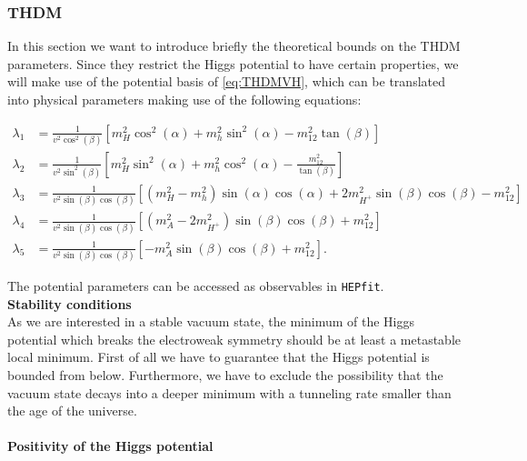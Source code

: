 \documentclass[preprint,3p,12pt]{elsarticle}
\newcommand{\HEPfit}{\texttt{HEPfit}\xspace}
\begin{document}
\subsubsection{THDM}

In this section we want to introduce briefly the theoretical bounds on the THDM parameters. Since they restrict the Higgs potential to have certain properties, we will make use of the potential basis of \eqref{eq:THDMVH}, which can be translated into physical parameters making use of the following equations:

\begin{align}
 \lambda_1 &=\frac{1}{v^2\cos ^2(\beta)}\left[ m_H^2\cos^2(\alpha) + m_h^2\sin^2(\alpha) - m_{12}^2\tan (\beta)\right] \label{eq:lambda1} \\
 \lambda_2 &=\frac{1}{v^2\sin ^2(\beta)}\left[ m_H^2\sin^2(\alpha) + m_h^2\cos^2(\alpha) - \frac{m_{12}^2}{\tan (\beta)}\right] \label{eq:lambda2} \\
 \lambda_3 &=\frac{1}{v^2\sin(\beta)\cos(\beta)}\left[ \left( m_H^2 - m_h^2\right) \sin(\alpha)\cos(\alpha) + 2m_{H^+}^2\sin(\beta)\cos(\beta) - m_{12}^2\right] \nonumber\\
 \lambda_4 &=\frac{1}{v^2\sin(\beta)\cos(\beta)}\left[ \left( m_A^2 - 2m_{H^+}^2\right) \sin(\beta)\cos(\beta) + m_{12}^2\right] \nonumber\\
 \lambda_5 &=\frac{1}{v^2\sin(\beta)\cos(\beta)}\left[ -m_A^2\sin(\beta)\cos(\beta) + m_{12}^2\right] \nonumber.
\end{align}

The potential parameters can be accessed as observables in \HEPfit.\\

\textbf{Stability conditions}\\

As we are interested in a stable vacuum state, the minimum of the Higgs potential which breaks the electroweak symmetry should be at least a metastable local minimum. First of all we have to guarantee that the Higgs potential is bounded from below. Furthermore, we have to exclude the possibility that the vacuum state decays into a deeper minimum with a tunneling rate smaller than the age of the universe.\\

\paragraph{Positivity of the Higgs potential}
\end{document}

